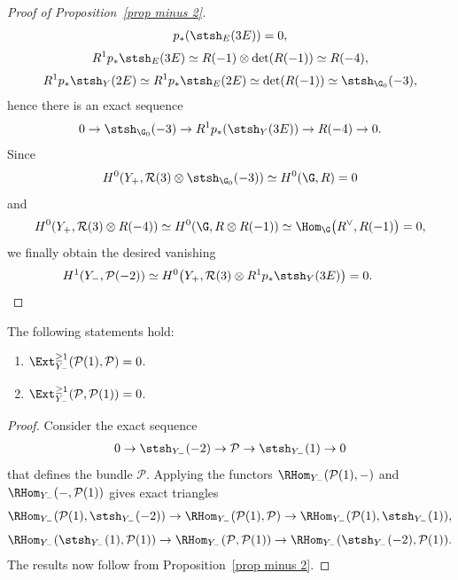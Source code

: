 \begin{proof}[Proof of Proposition~\ref{prop minus 2}]
\begin{gather*}
p_*(\stsh_E(3E)) = 0, \\[.5ex]
R^1p_*\stsh_E(3E) \simeq R(-1) \otimes \det(R(-1)) \simeq R(-4),\\[.5ex]
R^1p_*\stsh_Y(2E) \simeq R^1p_*\stsh_E(2E) \simeq \det(R(-1)) \simeq \stsh_{\G_0}(-3),
\end{gather*}
hence there is an exact sequence
\begin{gather*}
0 \to \stsh_{\G_0}(-3) \to R^1p_*(\stsh_Y(3E)) \to R(-4) \to 0.
\end{gather*}
Since
\begin{align*}
H^{0}(Y_+, \mathcal{R}(3) \otimes \stsh_{\G_0}(-3)) \simeq H^{0}(\G, R) = 0
\end{align*}
and
\begin{gather*}
H^0(Y_+, \mathcal{R}(3) \otimes R(-4)) \simeq H^0(\G, R \otimes R(-1)) \simeq \Hom_{\G}\big(R^{\vee}, R(-1)\big) = 0,
\end{gather*}
we finally obtain the desired vanishing
\begin{gather*}
H^1(Y_-, \mathcal{P}(-2)) \simeq H^0\big(Y_+, \mathcal{R}(3) \otimes R^1p_*\stsh_Y(3E)\big) = 0.
\tag*{\qed}
\end{gather*}
\renewcommand{\qed}{}
\end{proof}

\begin{Corollary}
The following statements hold:
\begin{enumerate}\itemsep=0pt
\item[$1.$] $\Ext_{Y_-}^{\geq 1}(\mathcal{P}(1), \mathcal{P}) = 0$.
\item[$2.$] $\Ext_{Y_-}^{\geq 1}(\mathcal{P}, \mathcal{P}(1)) = 0$.
\end{enumerate}
\end{Corollary}

\begin{proof}
Consider the exact sequence
\begin{gather*}
0 \to \stsh_{Y_-}(-2) \to \mathcal{P} \to \stsh_{Y_-}(1) \to 0
\end{gather*}
that defines the bundle $\mathcal{P}$.
Applying the functors $\RHom_{Y_-}(\mathcal{P}(1),-)$ and $\RHom_{Y_-}(-, \mathcal{P}(1))$
gives exact triangles
\begin{gather*}
\RHom_{Y_-}(\mathcal{P}(1),\stsh_{Y_-}(-2)) \to \RHom_{Y_-}(\mathcal{P}(1),\mathcal{P}) \to \RHom_{Y_-}(\mathcal{P}(1),\stsh_{Y_-}(1)), \\[1ex]
\RHom_{Y_-}(\stsh_{Y_-}(1), \mathcal{P}(1)) \to \RHom_{Y_-}(\mathcal{P}, \mathcal{P}(1)) \to \RHom_{Y_-}(\stsh_{Y_-}(-2), \mathcal{P}(1)).
\end{gather*}
The results now follow from Proposition~\ref{prop minus 2}.
\end{proof}

